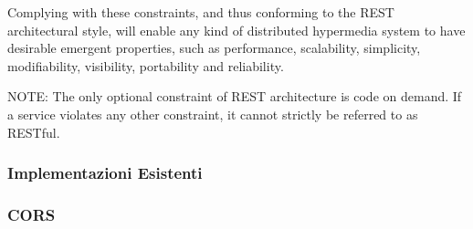 \begin{description}
Complying with these constraints, and thus conforming to the REST architectural style, will enable any kind of distributed hypermedia system to have desirable emergent properties, such as performance, scalability, simplicity, modifiability, visibility, portability and reliability.

NOTE: The only optional constraint of REST architecture is code on demand. If a service violates any other constraint, it cannot strictly be referred to as RESTful.
\end{description}

\subsubsection{Implementazioni Esistenti}

\subsubsection{CORS}

%
%    

